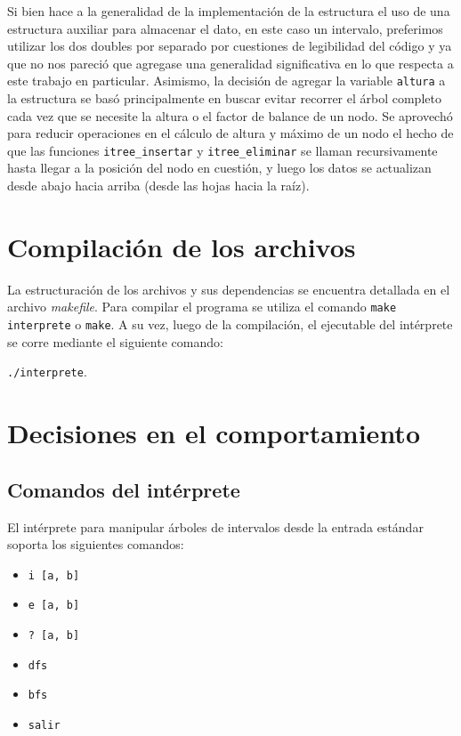 \documentclass[11pt]{article}
\begin{document}
Si bien hace a la generalidad de la implementación de la estructura el uso de una estructura auxiliar para almacenar el dato, en este caso un intervalo, preferimos utilizar los dos doubles por separado por cuestiones de legibilidad del código y ya que no nos pareció que agregase una generalidad significativa en lo que respecta a este trabajo en particular.
Asimismo, la decisión de agregar la variable \verb|altura| a la estructura se basó principalmente en buscar evitar recorrer el árbol completo cada vez que se necesite la altura o el factor de balance de un nodo. Se aprovechó para reducir operaciones en el cálculo de altura y máximo de un nodo el hecho de que las funciones \verb|itree_insertar| y \verb|itree_eliminar| se llaman recursivamente hasta llegar a la posición del nodo en cuestión, y luego los datos se actualizan desde abajo hacia arriba (desde las hojas hacia la raíz). \par


\section{Compilación de los archivos}

La estructuración de los archivos y sus dependencias se encuentra detallada en el archivo \textit{makefile}. 
Para compilar el programa se utiliza el comando \verb|make interprete| o \verb|make|. A su vez, luego de la compilación, el ejecutable del intérprete se corre mediante el siguiente comando:\par

\noindent \verb|./interprete|. \par


\section{Decisiones en el comportamiento}

\subsection{Comandos del intérprete}

El intérprete para manipular árboles de intervalos desde la entrada estándar soporta los siguientes comandos:

\vspace{-0.5cm}
\begin{itemize}
    \item \verb|i [a, b]|
    \vspace{-0.3cm}
    \item \verb|e [a, b]|
    \vspace{-0.3cm}
    \item \verb|? [a, b]|
    \vspace{-0.3cm}
    \item \verb|dfs|
    \vspace{-0.3cm}
    \item \verb|bfs|
    \vspace{-0.3cm}
    \item \verb|salir|
\end{itemize}
\vspace{-0.5cm}
\end{document}
